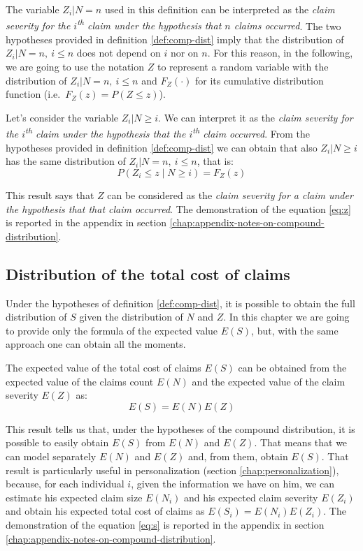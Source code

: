\documentclass[a4paper, twoside, openright, 12pt]{report}
\theoremstyle{definition}
\theoremstyle{definition}
\theoremstyle{definition}
\theoremstyle{remark}
\begin{document}
The variable \(Z_i|N=n\) used in this definition can be interpreted as the \emph{claim severity for the \(i\)\textsuperscript{th} claim under the hypothesis that \(n\) claims occurred}. The two hypotheses provided in definition \ref{def:comp-dist} imply that the distribution of \(Z_i|N=n, \ i\le n\) does not depend on \(i\) nor on \(n\). For this reason, in the following, we are going to use the notation \(Z\) to represent a random variable with the distribution of \(Z_i|N=n, \ i\le n\) and \(F_Z(\cdot)\) for its cumulative distribution function (i.e.~\(F_Z(z) = P(Z\le z)\)).

Let's consider the variable \(Z_i|N\ge i\). We can interpret it as the \emph{claim severity for the \(i\)\textsuperscript{th} claim under the hypothesis that the \(i\)\textsuperscript{th} claim occurred}. From the hypotheses provided in definition \ref{def:comp-dist} we can obtain that also \(Z_i|N\ge i\) has the same distribution of \(Z_i|N=n, \ i\le n\), that is:
\begin{equation}
\label{eq:z}
P\left(Z_i \le z \middle| N\ge i \right) = F_Z(z)
\end{equation}

This result says that \(Z\) can be considered as the \emph{claim severity for a claim under the hypothesis that that claim occurred}. The demonstration of the equation \eqref{eq:z} is reported in the appendix in section \ref{chap:appendix-notes-on-compound-distribution}.

\hypertarget{chap:tcc-dist}{%
\subsection{Distribution of the total cost of claims}\label{chap:tcc-dist}}

Under the hypotheses of definition \ref{def:comp-dist}, it is possible to obtain the full distribution of \(S\) given the distribution of \(N\) and \(Z\). In this chapter we are going to provide only the formula of the expected value \(E(S)\), but, with the same approach one can obtain all the moments.

The expected value of the total cost of claims \(E(S)\) can be obtained from the expected value of the claims count \(E(N)\) and the expected value of the claim severity \(E(Z)\) as:
\begin{equation}
\label{eq:s}
E(S) = E(N)E(Z)
\end{equation}

This result tells us that, under the hypotheses of the compound distribution, it is possible to easily obtain \(E(S)\) from \(E(N)\) and \(E(Z)\). That means that we can model separately \(E(N)\) and \(E(Z)\) and, from them, obtain \(E(S)\). That result is particularly useful in personalization (section \ref{chap:personalization}), because, for each individual \(i\), given the information we have on him, we can estimate his expected claim size \(E(N_i)\) and his expected claim severity \(E(Z_i)\) and obtain his expected total cost of claims as \(E(S_i) = E(N_i) E(Z_i)\). The demonstration of the equation \eqref{eq:s} is reported in the appendix in section \ref{chap:appendix-notes-on-compound-distribution}.
\end{document}
